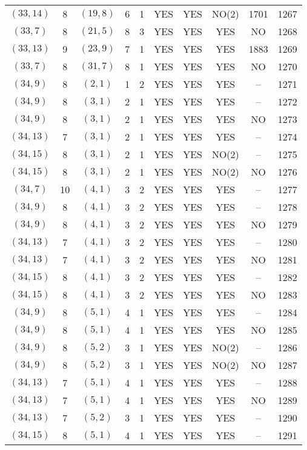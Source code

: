 \begin{longtable}{|c|c|c|c|c|c|c|c|c|c|}
$(33, 14)$ & 8 & $(19, 8)$ & 6 & 1 & YES & YES & NO(2) & 1701 & 1267\\
$(33, 7)$ & 8 & $(21, 5)$ & 8 & 3 & YES & YES & YES & NO & 1268\\
$(33, 13)$ & 9 & $(23, 9)$ & 7 & 1 & YES & YES & YES & 1883 & 1269\\
$(33, 7)$ & 8 & $(31, 7)$ & 8 & 1 & YES & YES & YES & NO & 1270\\
$(34, 9)$ & 8 & $(2, 1)$ & 1 & 2 & YES & YES & YES & -- & 1271\\
$(34, 9)$ & 8 & $(3, 1)$ & 2 & 1 & YES & YES & YES & -- & 1272\\
$(34, 9)$ & 8 & $(3, 1)$ & 2 & 1 & YES & YES & YES & NO & 1273\\
$(34, 13)$ & 7 & $(3, 1)$ & 2 & 1 & YES & YES & YES & -- & 1274\\
$(34, 15)$ & 8 & $(3, 1)$ & 2 & 1 & YES & YES & NO(2) & -- & 1275\\
$(34, 15)$ & 8 & $(3, 1)$ & 2 & 1 & YES & YES & NO(2) & NO & 1276\\
$(34, 7)$ & 10 & $(4, 1)$ & 3 & 2 & YES & YES & YES & -- & 1277\\
$(34, 9)$ & 8 & $(4, 1)$ & 3 & 2 & YES & YES & YES & -- & 1278\\
$(34, 9)$ & 8 & $(4, 1)$ & 3 & 2 & YES & YES & YES & NO & 1279\\
$(34, 13)$ & 7 & $(4, 1)$ & 3 & 2 & YES & YES & YES & -- & 1280\\
$(34, 13)$ & 7 & $(4, 1)$ & 3 & 2 & YES & YES & YES & NO & 1281\\
$(34, 15)$ & 8 & $(4, 1)$ & 3 & 2 & YES & YES & YES & -- & 1282\\
$(34, 15)$ & 8 & $(4, 1)$ & 3 & 2 & YES & YES & YES & NO & 1283\\
$(34, 9)$ & 8 & $(5, 1)$ & 4 & 1 & YES & YES & YES & -- & 1284\\
$(34, 9)$ & 8 & $(5, 1)$ & 4 & 1 & YES & YES & YES & NO & 1285\\
$(34, 9)$ & 8 & $(5, 2)$ & 3 & 1 & YES & YES & NO(2) & -- & 1286\\
$(34, 9)$ & 8 & $(5, 2)$ & 3 & 1 & YES & YES & NO(2) & NO & 1287\\
$(34, 13)$ & 7 & $(5, 1)$ & 4 & 1 & YES & YES & YES & -- & 1288\\
$(34, 13)$ & 7 & $(5, 1)$ & 4 & 1 & YES & YES & YES & NO & 1289\\
$(34, 13)$ & 7 & $(5, 2)$ & 3 & 1 & YES & YES & YES & -- & 1290\\
$(34, 15)$ & 8 & $(5, 1)$ & 4 & 1 & YES & YES & YES & -- & 1291\\

\end{longtable}
